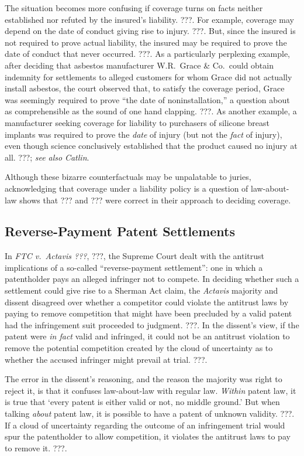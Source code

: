 \documentclass[
  12pt,
  letterpaper,
]{scrartcl}
\begin{document}
The situation becomes more confusing if coverage turns on facts neither
established nor refuted by the insured's liability. ???. For example, coverage
may depend on the date of conduct giving rise to injury. ???. But, since the
insured is not required to prove actual liability, the insured may be required
to prove the date of conduct that never occurred. ???. As a particularly
perplexing example, after deciding that asbestos manufacturer W.R.~Grace \&
Co.~could obtain indemnity for settlements to alleged customers for whom Grace
did not actually install asbestos, the court observed that, to satisfy the
coverage period, Grace was seemingly required to prove ``the date of
noninstallation,'' a question about as comprehensible as the sound of one hand
clapping. ???. As another example, a manufacturer seeking coverage for
liability to purchasers of silicone breast implants was required to prove the
\emph{date} of injury (but not the \emph{fact} of injury), even though science
conclusively established that the product caused no injury at all. ???;
\textit{see also} \textit{Catlin}.

Although these bizarre counterfactuals may be unpalatable to juries,
acknowledging that coverage under a liability policy is a question of
law-about-law shows that ??? and ??? were correct in their approach to deciding
coverage.


\subsection{Reverse-Payment Patent Settlements}

In \textit{FTC v.~Actavis ???}, ???, the Supreme Court dealt with the antitrust
implications of a so-called ``reverse-payment settlement'': one in which a
patentholder pays an alleged infringer not to compete. In deciding whether such
a settlement could give rise to a Sherman Act claim, the \textit{Actavis}
majority and dissent disagreed over whether a competitor could violate the
antitrust laws by paying to remove competition that might have been precluded
by a valid patent had the infringement suit proceeded to judgment. ???. In the
dissent's view, if the patent were \emph{in fact} valid and infringed, it could
not be an antitrust violation to remove the potential competition created by
the cloud of uncertainty as to whether the accused infringer might prevail at
trial. ???.

The error in the dissent's reasoning, and the reason the majority was right to
reject it, is that it confuses law-about-law with regular law. \textit{Within}
patent law, it is true that `every patent is either valid or not, no middle
ground.' But when talking \textit{about} patent law, it is possible to have a
patent of unknown validity. ???. If a cloud of uncertainty regarding the
outcome of an infringement trial would spur the patentholder to allow
competition, it violates the antitrust laws to pay to remove it. ???.
\end{document}
